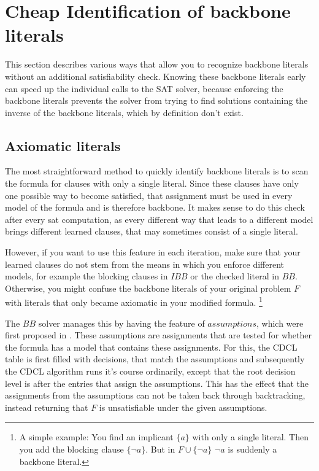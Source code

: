 \section{Cheap Identification of backbone literals}
This section describes various ways that allow you to recognize backbone literals without an additional satisfiability check. Knowing these backbone literals early can speed up the individual calls to the SAT solver, because enforcing the backbone literals prevents the solver from trying to find solutions containing the inverse of the backbone literals, which by definition don't exist.



\subsection{Axiomatic literals}
The most straightforward method to quickly identify backbone literals is to scan the formula for clauses with only a single literal. Since these clauses have only one possible way to become satisfied, that assignment must be used in every model of the formula and is therefore backbone. It makes sense to do this check after every sat computation, as every different way that leads to a different model brings different learned clauses, that may sometimes consist of a single literal.

However, if you want to use this feature in each iteration, make sure that your learned clauses do not stem from the means in which you enforce different models, for example the blocking clauses in $IBB$ or the checked literal in $BB$. Otherwise, you might confuse the backbone literals of your original problem $F$ with literals that only became axiomatic in your modified formula. \footnote{A simple example: You find an implicant $\{a\}$ with only a single literal. Then you add the blocking clause $\{\neg a\}$. But in $F \cup \{\neg a\}$ $\neg a$ is suddenly a backbone literal.}

The $BB$ solver manages this by having the feature of $assumptions$, which were first proposed in \cite{ENSO03}. These assumptions are assignments that are tested for whether the formula has a model that contains these assignments. For this, the CDCL table is first filled with decisions, that match the assumptions and subsequently the CDCL algorithm runs it's course ordinarily, except that the root decision level is after the entries that assign the assumptions. This has the effect that the assignments from the assumptions can not be taken back through backtracking, instead returning that $F$ is unsatisfiable under the given assumptions.

